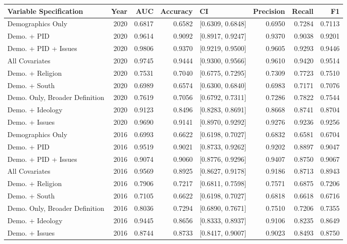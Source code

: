 \begin{longtable}{lrrrlrrr}
  \toprule
Variable Specification & Year & AUC & Accuracy & CI & Precision & Recall & F1 \\ 
  \midrule
Demographics Only & 2020 & 0.6817 & 0.6582 & [0.6309, 0.6848] & 0.6950 & 0.7284 & 0.7113 \\ 
  Demo. + PID & 2020 & 0.9614 & 0.9092 & [0.8917, 0.9247] & 0.9370 & 0.9038 & 0.9201 \\ 
  Demo. + PID + Issues & 2020 & 0.9806 & 0.9370 & [0.9219, 0.9500] & 0.9605 & 0.9293 & 0.9446 \\ 
  All Covariates & 2020 & 0.9745 & 0.9444 & [0.9300, 0.9566] & 0.9610 & 0.9420 & 0.9514 \\ 
  Demo. + Religion & 2020 & 0.7531 & 0.7040 & [0.6775, 0.7295] & 0.7309 & 0.7723 & 0.7510 \\ 
  Demo. + South & 2020 & 0.6989 & 0.6574 & [0.6300, 0.6840] & 0.6983 & 0.7171 & 0.7076 \\ 
  Demo. Only, Broader Definition & 2020 & 0.7619 & 0.7056 & [0.6792, 0.7311] & 0.7286 & 0.7822 & 0.7544 \\ 
  Demo. + Ideology & 2020 & 0.9123 & 0.8496 & [0.8283, 0.8691] & 0.8668 & 0.8741 & 0.8704 \\ 
  Demo. + Issues & 2020 & 0.9690 & 0.9141 & [0.8970, 0.9292] & 0.9276 & 0.9236 & 0.9256 \\ 
  Demographics Only & 2016 & 0.6993 & 0.6622 & [0.6198, 0.7027] & 0.6832 & 0.6581 & 0.6704 \\ 
  Demo. + PID & 2016 & 0.9519 & 0.9021 & [0.8733, 0.9262] & 0.9202 & 0.8897 & 0.9047 \\ 
  Demo. + PID + Issues & 2016 & 0.9074 & 0.9060 & [0.8776, 0.9296] & 0.9407 & 0.8750 & 0.9067 \\ 
  All Covariates & 2016 & 0.9569 & 0.8925 & [0.8627, 0.9178] & 0.9186 & 0.8713 & 0.8943 \\ 
  Demo. + Religion & 2016 & 0.7906 & 0.7217 & [0.6811, 0.7598] & 0.7571 & 0.6875 & 0.7206 \\ 
  Demo. + South & 2016 & 0.7105 & 0.6622 & [0.6198, 0.7027] & 0.6818 & 0.6618 & 0.6716 \\ 
  Demo. Only, Broader Definition & 2016 & 0.8036 & 0.7294 & [0.6890, 0.7671] & 0.7510 & 0.7206 & 0.7355 \\ 
  Demo. + Ideology & 2016 & 0.9445 & 0.8656 & [0.8333, 0.8937] & 0.9106 & 0.8235 & 0.8649 \\ 
  Demo. + Issues & 2016 & 0.8744 & 0.8733 & [0.8417, 0.9007] & 0.9023 & 0.8493 & 0.8750 \\ 

\end{longtable}
